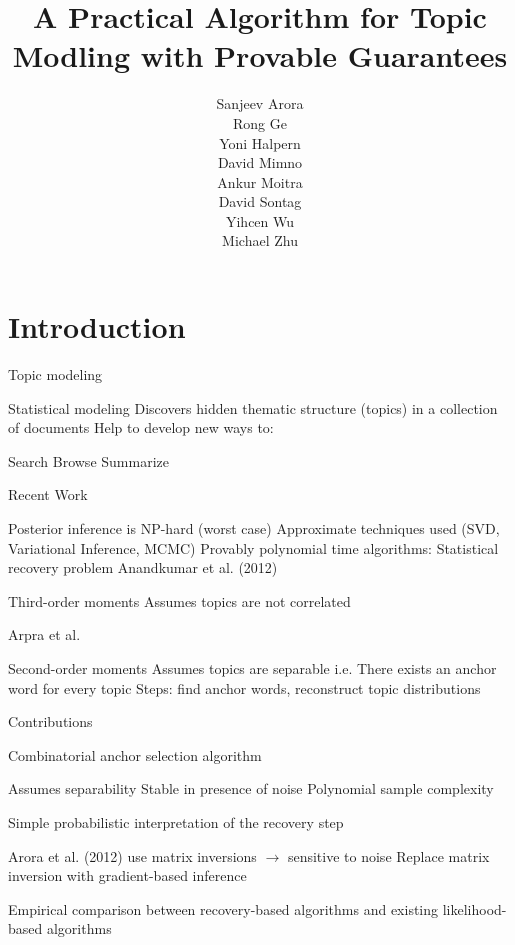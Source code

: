 \documentclass{lecture}
\title{A Practical Algorithm for Topic Modling with Provable Guarantees}
\author[Vanush \& Kristy]{Sanjeev Arora\\
		Rong Ge\\
		Yoni Halpern\\
		David Mimno\\
		Ankur Moitra\\
		David Sontag\\
		Yihcen Wu\\
		Michael Zhu}
\institute[\textschwa-lab]{Presented by: Vanush Vaswani and Kristy Hughes}
\date{}
\begin{document}
\AtBeginSection[]
{
  \begin{frame}
    \tableofcontents[currentsection]
  \end{frame}
}

\titleslide

\section[Intro]{Introduction}

\begin{plain}{Topic modeling}
	\begin{itemize}
		\p Statistical modeling
		\p Discovers hidden thematic structure (topics) in a collection of documents
		\p Help to develop new ways to:
		\begin{itemize}
			\p Search
			\p Browse
			\p Summarize
		\end{itemize}
	\end{itemize}
\end{plain}


\begin{plain}{Recent Work}
	\begin{itemize}
		\p Posterior inference is NP-hard (worst case)
		\p Approximate techniques used (SVD, Variational Inference, MCMC)
		\p Provably polynomial time algorithms: Statistical recovery problem
		\p Anandkumar et al. (2012)
			\begin{itemize}
				\p Third-order moments
				\p Assumes topics are not correlated
			\end{itemize}
		\p Arpra et al. 
			\begin{itemize}
				\p Second-order moments
				\p Assumes topics are separable 
				\p i.e. There exists an anchor word for every topic
				\p Steps: find anchor words, reconstruct topic distributions
			\end{itemize}
	\end{itemize}
\end{plain}

\begin{plain}{Contributions}
	\begin{itemize}
		\p Combinatorial anchor selection algorithm
			\begin{itemize}
				\p Assumes separability
				\p Stable in presence of noise
				\p Polynomial sample complexity
			\end{itemize}
		\p Simple probabilistic interpretation of the recovery step
			\begin{itemize}
				\p Arora et al. (2012) use matrix inversions $\rightarrow$ sensitive to noise
				\p Replace matrix inversion with gradient-based inference
			\end{itemize}
		\p Empirical comparison between recovery-based algorithms and existing likelihood-based algorithms
	\end{itemize}
\end{plain}
\end{document}
